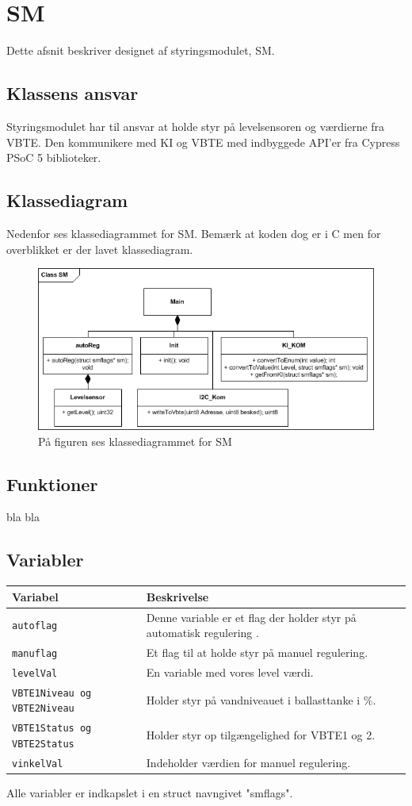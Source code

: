 \chapter{SM}
Dette afsnit beskriver designet af styringsmodulet, SM.
\section{Klassens ansvar}
Styringsmodulet har til ansvar at holde styr på levelsensoren og værdierne fra VBTE. Den kommunikere med KI og VBTE med indbyggede API'er fra Cypress PSoC 5 biblioteker. 
\section{Klassediagram}
Nedenfor ses klassediagrammet for SM. Bemærk at koden dog er i C men for overblikket er der lavet klassediagram.
\begin{figure}[H]
\centering
\includegraphics[width=1\textwidth]{billeder/smKlassediagram}
\caption{På figuren ses klassediagrammet for SM}
\end{figure}
\section{Funktioner}
bla bla
\section{Variabler}
\begin{table}[H]
\begin{tabular}{|l|p{10cm}|}
\hline
\cellcolor[gray]{0.8}\textbf{Variabel} &\cellcolor[gray]{0.8} \textbf{Beskrivelse}\\ \hline
\texttt{autoflag} & Denne variable er et flag der holder styr på automatisk regulering .\\ \hline
\texttt{manuflag} & Et flag til at holde styr på manuel regulering.\\ \hline
\texttt{levelVal} & En variable med vores level værdi.\\ \hline
\texttt{VBTE1Niveau og VBTE2Niveau} & Holder styr på vandniveauet i ballasttanke i \%. \\ \hline
\texttt{VBTE1Status og VBTE2Status} & Holder styr op tilgængelighed for VBTE1 og 2.\\ \hline
\texttt{vinkelVal} & Indeholder værdien for manuel regulering.\\ \hline
\end{tabular}
\end{table}
Alle variabler er indkapslet i en struct navngivet "smflags".
